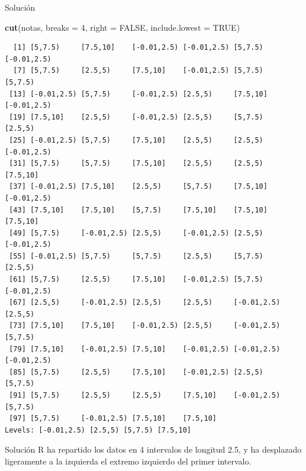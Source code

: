 \documentclass[
  ignorenonframetext,
  aspectratio=169]{beamer}
\newenvironment{Shaded}{\begin{snugshade}}{\end{snugshade}}
\newcommand{\AttributeTok}[1]{\textcolor[rgb]{0.13,0.29,0.53}{#1}}
\newcommand{\ConstantTok}[1]{\textcolor[rgb]{0.56,0.35,0.01}{#1}}
\newcommand{\DecValTok}[1]{\textcolor[rgb]{0.00,0.00,0.81}{#1}}
\newcommand{\FunctionTok}[1]{\textcolor[rgb]{0.13,0.29,0.53}{\textbf{#1}}}
\newcommand{\NormalTok}[1]{#1}
\begin{document}
\begin{frame}[fragile]{Solución}
\label{soluciuxf3n-23}
\begin{Shaded}
\begin{Highlighting}[]
\FunctionTok{cut}\NormalTok{(notas, }\AttributeTok{breaks =} \DecValTok{4}\NormalTok{, }\AttributeTok{right =} \ConstantTok{FALSE}\NormalTok{, }\AttributeTok{include.lowest =} \ConstantTok{TRUE}\NormalTok{)}
\end{Highlighting}
\end{Shaded}

\begin{verbatim}
  [1] [5,7.5)     [7.5,10]    [-0.01,2.5) [-0.01,2.5) [5,7.5)     [-0.01,2.5)
  [7] [5,7.5)     [2.5,5)     [7.5,10]    [-0.01,2.5) [5,7.5)     [5,7.5)    
 [13] [-0.01,2.5) [5,7.5)     [-0.01,2.5) [2.5,5)     [7.5,10]    [-0.01,2.5)
 [19] [7.5,10]    [2.5,5)     [-0.01,2.5) [2.5,5)     [5,7.5)     [2.5,5)    
 [25] [-0.01,2.5) [5,7.5)     [7.5,10]    [2.5,5)     [2.5,5)     [-0.01,2.5)
 [31] [5,7.5)     [5,7.5)     [7.5,10]    [2.5,5)     [2.5,5)     [7.5,10]   
 [37] [-0.01,2.5) [7.5,10]    [2.5,5)     [5,7.5)     [7.5,10]    [-0.01,2.5)
 [43] [7.5,10]    [7.5,10]    [5,7.5)     [7.5,10]    [7.5,10]    [7.5,10]   
 [49] [5,7.5)     [-0.01,2.5) [2.5,5)     [-0.01,2.5) [2.5,5)     [-0.01,2.5)
 [55] [-0.01,2.5) [5,7.5)     [5,7.5)     [2.5,5)     [5,7.5)     [2.5,5)    
 [61] [5,7.5)     [2.5,5)     [7.5,10]    [-0.01,2.5) [5,7.5)     [-0.01,2.5)
 [67] [2.5,5)     [-0.01,2.5) [2.5,5)     [2.5,5)     [-0.01,2.5) [2.5,5)    
 [73] [7.5,10]    [7.5,10]    [-0.01,2.5) [2.5,5)     [-0.01,2.5) [5,7.5)    
 [79] [7.5,10]    [-0.01,2.5) [7.5,10]    [-0.01,2.5) [-0.01,2.5) [-0.01,2.5)
 [85] [5,7.5)     [2.5,5)     [7.5,10]    [-0.01,2.5) [2.5,5)     [5,7.5)    
 [91] [5,7.5)     [2.5,5)     [2.5,5)     [7.5,10]    [-0.01,2.5) [5,7.5)    
 [97] [5,7.5)     [-0.01,2.5) [7.5,10]    [7.5,10]   
Levels: [-0.01,2.5) [2.5,5) [5,7.5) [7.5,10]
\end{verbatim}
\end{frame}

\begin{frame}{Solución}
\label{soluciuxf3n-24}
R ha repartido los datos en 4 intervalos de longitud 2.5, y ha
desplazado ligeramente a la izquierda el extremo izquierdo del primer
intervalo.
\end{frame}
\end{document}
